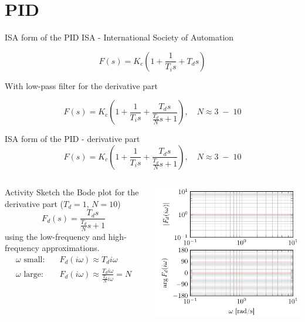 \documentclass[presentation,aspectratio=1610]{beamer}
\begin{document}
\section{PID}
\label{sec:orgc08e8ae}
\begin{frame}[label={sec:orgef96f64}]{ISA form of the PID}
ISA - International Society of Automation

\[ F(s) = K_c\left( 1 + \frac{1}{T_i s} + T_d s\right) \]

With low-pass filter for the derivative part

\[ F(s) = K_c\left( 1 + \frac{1}{T_i s} + \frac{T_d s}{\frac{T_d}{N} s + 1}\right), \quad N \approx 3\; - \; 10 \]
\end{frame}

\begin{frame}[label={sec:orgc489bcc}]{ISA form of the PID - derivative part}
\[ F(s) = K_c\left( 1 + \frac{1}{T_i s} + \frac{T_d s}{\frac{T_d}{N} s + 1}\right), \quad N \approx 3\; - \; 10 \]

\begin{columns}
\begin{column}{0.4\columnwidth}
\alert{Activity} Sketch the Bode plot for the derivative part (\(T_d = 1\), \(N=10\))
\[F_d(s) = \frac{T_d s}{\frac{T_d}{N} s + 1}\] using the low-frequency and high-frequency approximations.
\begin{align*}
 \text{$\omega$ small:} \quad & F_d(i\omega) \approx T_d i\omega \\
 \text{$\omega$ large:} \quad & F_d(i\omega) \approx \frac{T_d i \omega }{\frac{T_d}{N} i\omega} = N
\end{align*}
\end{column}


\begin{column}{0.6\columnwidth}
\begin{center}
\includegraphics[width=\linewidth]{../../figures/bode-derivative-empty}
\end{center}
\end{column}
\end{columns}
\end{frame}
\end{document}
